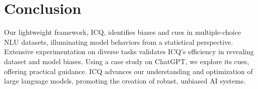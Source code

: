 \section{Conclusion}
%
%
Our lightweight framework, ICQ, identifies biases and cues in multiple-choice NLU datasets, 
illuminating model behaviors from a statistical perspective. 
Extensive experimentation on diverse tasks validates 
ICQ's efficiency in revealing dataset and model biases. 
Using a case study on ChatGPT, we explore its cues, 
offering practical guidance. ICQ advances our understanding 
and optimization of large language models, 
promoting the creation of robust, unbiased AI systems.
